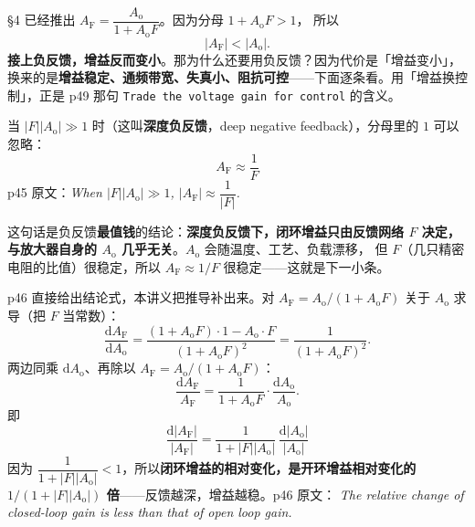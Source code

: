 \documentclass[11pt]{ctexart}
\begin{document}


§4 已经推出 $A_{\mathrm{F}}=\dfrac{A_{\mathrm{o}}}{1+A_{\mathrm{o}}F}$。因为分母 $1+A_{\mathrm{o}}F>1$，
所以
\[
|A_{\mathrm{F}}|<|A_{\mathrm{o}}| .
\]
\textbf{接上负反馈，增益反而变小}。那为什么还要用负反馈？因为代价是「增益变小」，
换来的是\textbf{增益稳定、通频带宽、失真小、阻抗可控}——下面逐条看。用「增益换控制」，正是 p49
那句 \texttt{Trade the voltage gain for control} 的含义。


当 $|F||A_{\mathrm{o}}|\gg1$ 时（这叫\textbf{深度负反馈}，deep negative feedback），分母里的
$1$ 可以忽略：
\[
\boxed{\;A_{\mathrm{F}}\approx\frac{1}{F}\;}
\]
p45 原文：\textit{When $|F||A_{\mathrm{o}}|\gg1$, $|A_{\mathrm{F}}|\approx\dfrac{1}{|F|}$.}

这句话是负反馈\textbf{最值钱}的结论：\textbf{深度负反馈下，闭环增益只由反馈网络 $F$ 决定，
与放大器自身的 $A_{\mathrm{o}}$ 几乎无关}。$A_{\mathrm{o}}$ 会随温度、工艺、负载漂移，
但 $F$（几只精密电阻的比值）很稳定，所以 $A_{\mathrm{F}}\approx1/F$ 很稳定——这就是下一小条。


p46 直接给出结论式，本讲义把推导补出来。对 $A_{\mathrm{F}}=A_{\mathrm{o}}/(1+A_{\mathrm{o}}F)$
关于 $A_{\mathrm{o}}$ 求导（把 $F$ 当常数）：
\[
\frac{\mathrm{d}A_{\mathrm{F}}}{\mathrm{d}A_{\mathrm{o}}}
=\frac{(1+A_{\mathrm{o}}F)\cdot 1-A_{\mathrm{o}}\cdot F}{(1+A_{\mathrm{o}}F)^2}
=\frac{1}{(1+A_{\mathrm{o}}F)^2}.
\]
两边同乘 $\mathrm{d}A_{\mathrm{o}}$、再除以 $A_{\mathrm{F}}=A_{\mathrm{o}}/(1+A_{\mathrm{o}}F)$：
\[
\frac{\mathrm{d}A_{\mathrm{F}}}{A_{\mathrm{F}}}
=\frac{1}{1+A_{\mathrm{o}}F}\cdot\frac{\mathrm{d}A_{\mathrm{o}}}{A_{\mathrm{o}}} .
\]
即
\[
\boxed{\;\frac{\mathrm{d}|A_{\mathrm{F}}|}{|A_{\mathrm{F}}|}
=\frac{1}{1+|F||A_{\mathrm{o}}|}\,\frac{\mathrm{d}|A_{\mathrm{o}}|}{|A_{\mathrm{o}}|}\;}
\]
因为 $\dfrac{1}{1+|F||A_{\mathrm{o}}|}<1$，所以\textbf{闭环增益的相对变化，是开环增益相对变化的
$1/(1+|F||A_{\mathrm{o}}|)$ 倍}——反馈越深，增益越稳。p46 原文：
\textit{The relative change of closed-loop gain is less than that of open loop gain.}

\end{document}

